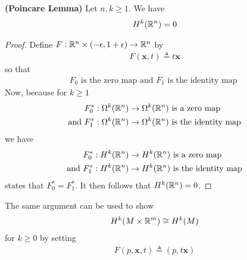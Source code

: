 \documentclass{report}
\begin{document}
\begin{corollary}
\label{PL}
\textbf{(Poincare Lemma)} Let $n,k\geq 1$. We have 
\begin{align*}
H^k(\mathbb{R}^n)=0 
\end{align*}
\end{corollary}
\begin{proof}
 Define $F:\mathbb{R}^n\times (-\epsilon ,1+\epsilon )\rightarrow \mathbb{R}^n$ by 
  \begin{align*}
  F(\textbf{x},t)\triangleq t\textbf{x}
  \end{align*}
so that 
\begin{align*}
F_0\text{ is the zero map and $F_1$ is the identity map }
\end{align*}
Now, because for $k\geq 1$
\begin{align*}
  &F_0^*:\Omega^k(\mathbb{R}^n)\rightarrow \Omega^k(\mathbb{R}^n)\text{ is a zero map } \\
  \text{ and }&F_1^* :\Omega^k(\mathbb{R}^n)\rightarrow \Omega^k (\mathbb{R}^n)\text{ is the identity map }
\end{align*}
we have 
\begin{align*}
&F_0^*:H^k(\mathbb{R}^n)\rightarrow H^k(\mathbb{R}^n)\text{ is a zero map } \\
  \text{ and }&F_1^*:H^k(\mathbb{R}^n)\rightarrow H^k(\mathbb{R}^n)\text{ is the identity map }
\end{align*}
 states that $F_0^*=F_1^*$. It then follows that $H^k(\mathbb{R}^n)=0$.
\end{proof}
\begin{mdframed}
The same argument can be used to show 
\begin{align}
\label{hkm}
H^k(M\times \mathbb{R}^m)\cong  H^k(M)
\end{align}
for $k\geq 0$ by setting 
\begin{align*}
F(p,\textbf{x},t)\triangleq (p,t \textbf{x})
\end{align*}
\end{mdframed}
\end{document}

